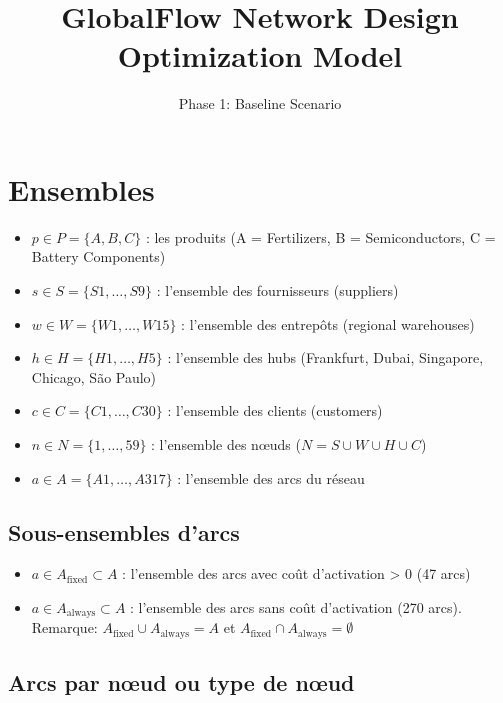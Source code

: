 \documentclass{article}
\begin{document}
\title{GlobalFlow Network Design Optimization Model}
\author{Phase 1: Baseline Scenario}
\date{}
\maketitle

\section{Ensembles}

\begin{itemize}
    \item $p \in P = \{A, B, C\}$ : les produits (A = Fertilizers, B = Semiconductors, C = Battery Components)
    \item $s \in S = \{S1, \dots, S9\}$ : l'ensemble des fournisseurs (suppliers)
    \item $w \in W = \{W1, \dots, W15\}$ : l'ensemble des entrepôts (regional warehouses)
    \item $h \in H = \{H1, \dots, H5\}$ : l'ensemble des hubs (Frankfurt, Dubai, Singapore, Chicago, São Paulo)
    \item $c \in C = \{C1, \dots, C30\}$ : l'ensemble des clients (customers)
    \item $n \in N = \{1, \dots, 59\}$ : l'ensemble des nœuds ($N = S \cup W \cup H \cup C$)
    \item $a \in A = \{A1, \dots, A317\}$ : l'ensemble des arcs du réseau
\end{itemize}

\subsection{Sous-ensembles d'arcs}

\begin{itemize}
    \item $a \in A_{\text{fixed}} \subset A$ : l'ensemble des arcs avec coût d'activation > 0 (47 arcs)
    \item $a \in A_{\text{always}} \subset A$ : l'ensemble des arcs sans coût d'activation (270 arcs).
    \quad Remarque: $A_{\text{fixed}} \cup A_{\text{always}} = A$ et $A_{\text{fixed}} \cap A_{\text{always}} = \emptyset$
\end{itemize}

\subsection{Arcs par nœud ou type de nœud}
\end{document}
